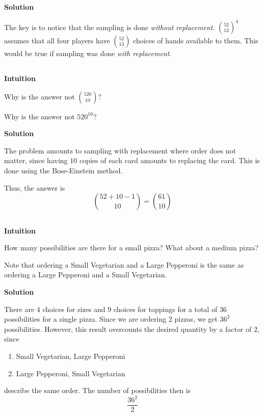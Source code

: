 \documentclass[]{book}
\providecommand{\tightlist}{%
  \setlength{\itemsep}{0pt}\setlength{\parskip}{0pt}}
\begin{document}
 \textbf{Solution}

The key is to notice that the sampling is done \emph{without
replacement}. \({52 \choose 13}^{4}\) assumes that all four players have
\({52 \choose 13}\) choices of hands available to them. This would be
true if sampling was done \emph{with replacement}.

\subsection{}\label{section-12}

\textbf{Intuition}

Why is the answer not \({520 \choose 10}\)?

Why is the answer not \(520^{10}\)?

 \textbf{Solution}

The problem amounts to sampling with replacement where order does not
matter, since having \(10\) copies of each card amounts to replacing the
card. This is done using the Bose-Einstein method.

Thus, the answer is \[{52 + 10 - 1 \choose 10} = {61 \choose 10}\]

\subsection{}\label{section-13}

\textbf{Intuition}

How many possibilities are there for a small pizza? What about a medium
pizza?

Note that ordering a Small Vegetarian and a Large Pepperoni is the same
as ordering a Large Pepperoni and a Small Vegetarian.

 \textbf{Solution}

There are \(4\) choices for sizes and \(9\) choices for toppings for a
total of \(36\) possibilities for a single pizza. Since we are ordering
\(2\) pizzas, we get \(36^{2}\) possibilities. However, this result
overcounts the desired quantity by a factor of \(2\), since

\begin{enumerate}
\def\labelenumi{\arabic{enumi}.}
\tightlist
\item
  Small Vegetarian, Large Pepperoni
\item
  Large Pepperoni, Small Vegetarian
\end{enumerate}

describe the same order. The number of possibilities then is
\[\frac{36^{2}}{2}\]
\end{document}
